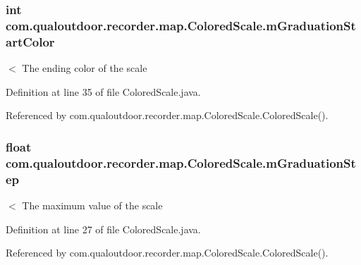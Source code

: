 \hypertarget{classcom_1_1qualoutdoor_1_1recorder_1_1map_1_1ColoredScale_a1620990b3e64cb7cf4d629e035779e6c}{
\subsubsection[{m\-Graduation\-Start\-Color}]{\setlength{\rightskip}{0pt plus 5cm}int com.\-qualoutdoor.\-recorder.\-map.\-Colored\-Scale.\-m\-Graduation\-Start\-Color\hspace{0.3cm}{\ttfamily [private]}}}\label{classcom_1_1qualoutdoor_1_1recorder_1_1map_1_1ColoredScale_a1620990b3e64cb7cf4d629e035779e6c}
$<$ The ending color of the scale 

Definition at line 35 of file Colored\-Scale.\-java.



Referenced by com.\-qualoutdoor.\-recorder.\-map.\-Colored\-Scale.\-Colored\-Scale().

\hypertarget{classcom_1_1qualoutdoor_1_1recorder_1_1map_1_1ColoredScale_a37da9656dfcfcfa61978d4f4689be5e3}{
\subsubsection[{m\-Graduation\-Step}]{\setlength{\rightskip}{0pt plus 5cm}float com.\-qualoutdoor.\-recorder.\-map.\-Colored\-Scale.\-m\-Graduation\-Step\hspace{0.3cm}{\ttfamily [private]}}}\label{classcom_1_1qualoutdoor_1_1recorder_1_1map_1_1ColoredScale_a37da9656dfcfcfa61978d4f4689be5e3}
$<$ The maximum value of the scale 

Definition at line 27 of file Colored\-Scale.\-java.



Referenced by com.\-qualoutdoor.\-recorder.\-map.\-Colored\-Scale.\-Colored\-Scale().

